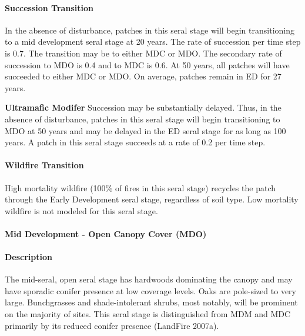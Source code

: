 \paragraph{Succession Transition} In the absence of disturbance, patches in this seral stage will begin transitioning to a mid development seral stage at 20 years. The rate of succession per time step is 0.7. The transition may be to either MDC or MDO. The secondary rate of succession to MDO is 0.4 and to MDC is 0.6. At 50 years, all patches will have succeeded to either MDC or MDO. On average, patches remain in ED for 27 years.
\begin{adjustwidth}{2cm}{}

\textbf{Ultramafic Modifer} Succession may be substantially delayed. Thus, in the absence of disturbance, patches in this seral stage will begin transitioning to MDO at 50 years and may be delayed in the ED seral stage for as long as 100 years. A patch in this seral stage succeeds at a rate of 0.2 per time step. 

\end{adjustwidth}
\paragraph{Wildfire Transition}
High mortality wildfire (100\% of fires in this seral stage) recycles the patch through the Early Development seral stage, regardless of soil type. Low mortality wildfire is not modeled for this seral stage.


\noindent\hrulefill


\paragraph{Mid Development - Open Canopy Cover (MDO)}

\paragraph{Description} The mid-seral, open seral stage has hardwoods dominating the canopy and may have sporadic conifer presence at low coverage levels. Oaks are pole-sized to very large. Bunchgrasses and shade-intolerant shrubs, most notably, will be prominent on the majority of sites. This seral stage is distinguished from MDM and MDC primarily by its reduced conifer presence (LandFire 2007a).

